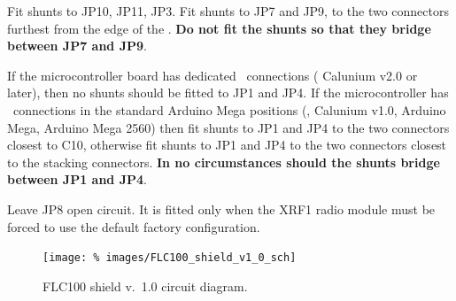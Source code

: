 Fit shunts to JP10, JP11, JP3. Fit shunts to JP7 and JP9, to the two
connectors furthest from the edge of the \pcb. \textbf{Do not fit the
  shunts so that they bridge between JP7 and JP9}.

If the microcontroller board has dedicated \itwoc\ connections (\eg
Calunium v2.0 or later), then no shunts should be fitted to JP1 and
JP4. If the microcontroller has \itwoc\ connections in the standard
Arduino Mega positions (\eg, Calunium v1.0, Arduino Mega, Arduino Mega
2560) then fit shunts to JP1 and JP4 to the two connectors closest to
C10, otherwise fit shunts to JP1 and JP4 to the two connectors closest
to the stacking connectors. \textbf{In no circumstances should the
  shunts bridge between JP1 and JP4}.

Leave JP8 open circuit. It is fitted only when the XRF1 radio module
must be forced to use the default factory configuration.

\begin{landscape}
  \begin{figure}[p]
    \centering
    \texttt{[image: \%
      images/FLC100\_shield\_v1\_0\_sch]}
    \caption{FLC100 shield v.~1.0 circuit diagram.}
    \label{fig:flc100-shield-v1.0-cct-diag}
  \end{figure}
\end{landscape}

